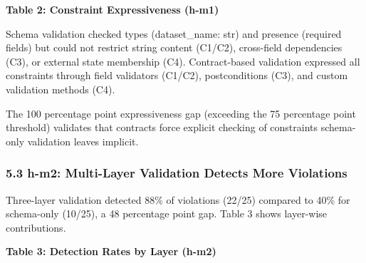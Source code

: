 \textbf{Table 2: Constraint Expressiveness (h-m1)}

\begin{table}[htbp]
\centering
{}
\end{table}

Schema validation checked types (dataset\_name: str) and presence (required fields) but could not restrict string content (C1/C2), cross-field dependencies (C3), or external state membership (C4). Contract-based validation expressed all constraints through field validators (C1/C2), postconditions (C3), and custom validation methods (C4).

The 100 percentage point expressiveness gap (exceeding the 75 percentage point threshold) validates that contracts force explicit checking of constraints schema-only validation leaves implicit.

\subsubsection{5.3 h-m2: Multi-Layer Validation Detects More Violations}

Three-layer validation detected 88\% of violations (22/25) compared to 40\% for schema-only (10/25), a 48 percentage point gap. Table 3 shows layer-wise contributions.

\textbf{Table 3: Detection Rates by Layer (h-m2)}

\begin{table}[htbp]
\centering
{}
\end{table}

